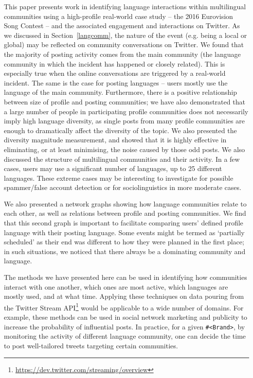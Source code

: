 \documentclass{llncs}
\begin{document}
{This paper presents work in identifying language interactions within
multilingual communities using a high-profile real-world case study --
the 2016 Eurovision Song Contest -- and the associated engagement and
interactions on Twitter. As we discussed in Section~\ref{langcomm},
the nature of the event (e.g. being a local or global) may be
reflected on community conversations on Twitter. We found that the
majority of posting activity comes from the main community (the
language community in which the incident has happened or closely
related). This is especially true when the online conversations are
triggered by a real-world incident. The same is the case for posting
languages -- users mostly use the language of the main
community. Furthermore, there is a positive relationship between size
of profile and posting communities; we have also demonstrated that a
large number of people in participating profile communities does not
necessarily imply high language diversity, as single posts from many
profile communities are enough to dramatically affect the diversity of
the topic. We also presented the diversity magnitude measurement, and
showed that it is highly effective in eliminating, or at least
minimising, the noise caused by those odd posts.  We also discussed
the structure of multilingual communities and their activity.  In a
few cases, users may use a significant number of languages, up to 25
different languages. These extreme cases may be interesting to
investigate for possible spammer/false account detection or for
sociolinguistics in more moderate cases.

We also presented a network graphs showing how language communities
relate to each other, as well as relations between profile and posting
communities. We find that this second graph is important to facilitate
comparing users' defined profile language with their posting
language. Some events might be termed as `partially scheduled' as
their end was different to how they were planned in the first place;
in such situations, we noticed that there always be a dominating
community and language.

The methods we have presented here can be used in identifying how
communities interact with one another, which ones are most active,
which languages are mostly used, and at what time. Applying these
techniques on data pouring from the Twitter Stream
API\footnote{\url{https://dev.twitter.com/streaming/overview}} would
be applicable to a wide number of domains. For example, these methods
can be used in social network marketing and publicity to increase the
probability of influential posts. In practice, for a given
{\texttt{\#<Brand>}}, by monitoring the activity of different language
community, one can decide the time to post well-tailored tweets
targeting certain communities.

}
\end{document}
